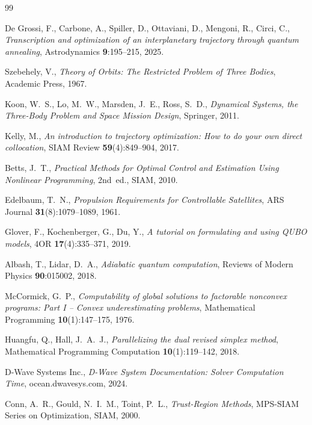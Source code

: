 \documentclass[11pt,a4paper]{article}
\theoremstyle{plain}
\begin{document}
\begin{thebibliography}{99}

  De Grossi, F., Carbone, A., Spiller, D., Ottaviani, D.,
  Mengoni, R., Circi, C.,
  \emph{Transcription and optimization of an interplanetary
   trajectory through quantum annealing},
  Astrodynamics \textbf{9}:195--215, 2025.

  Szebehely, V., \emph{Theory of Orbits: The Restricted Problem
   of Three Bodies}, Academic Press, 1967.

  Koon, W.~S., Lo, M.~W., Marsden, J.~E., Ross, S.~D.,
  \emph{Dynamical Systems, the Three-Body Problem and Space
   Mission Design}, Springer, 2011.

  Kelly, M., \emph{An introduction to trajectory optimization:
   How to do your own direct collocation}, SIAM Review
  \textbf{59}(4):849--904, 2017.

  Betts, J.~T., \emph{Practical Methods for Optimal Control and
   Estimation Using Nonlinear Programming}, 2nd~ed., SIAM, 2010.

  Edelbaum, T.~N., \emph{Propulsion Requirements for Controllable
   Satellites}, ARS Journal \textbf{31}(8):1079--1089, 1961.

  Glover, F., Kochenberger, G., Du, Y., \emph{A tutorial on
   formulating and using QUBO models},
  4OR \textbf{17}(4):335--371, 2019.

  Albash, T., Lidar, D.~A., \emph{Adiabatic quantum computation},
  Reviews of Modern Physics \textbf{90}:015002, 2018.

  McCormick, G.~P., \emph{Computability of global solutions to
   factorable nonconvex programs: Part I -- Convex
   underestimating problems}, Mathematical Programming
  \textbf{10}(1):147--175, 1976.

  Huangfu, Q., Hall, J.~A.~J., \emph{Parallelizing the dual
   revised simplex method}, Mathematical Programming Computation
  \textbf{10}(1):119--142, 2018.

  D-Wave Systems Inc., \emph{D-Wave System Documentation:
   Solver Computation Time}, ocean.dwavesys.com, 2024.

  Conn, A.~R., Gould, N.~I.~M., Toint, P.~L., \emph{Trust-Region
   Methods}, MPS-SIAM Series on Optimization, SIAM, 2000.


\end{thebibliography}
\end{document}
